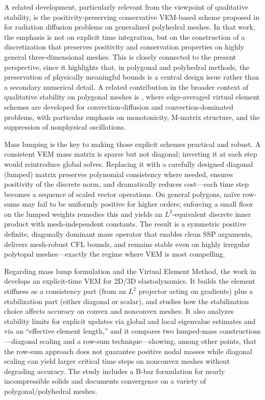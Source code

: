 \documentclass{article}
\begin{document}
A related development, particularly relevant from the viewpoint of qualitative stability, is the positivity-preserving conservative VEM-based scheme proposed in \cite{yang2022vem} for radiation diffusion problems on generalized polyhedral meshes. In that work, the emphasis is not on explicit time integration, but on the construction of a discretization that preserves positivity and conservation properties on highly general three-dimensional meshes. This is closely connected to the present perspective, since it highlights that, in polygonal and polyhedral methods, the preservation of physically meaningful bounds is a central design issue rather than a secondary numerical detail. A related contribution in the broader context of qualitative stability on polygonal meshes is \cite{cao2025edge}, where edge-averaged virtual element schemes are developed for convection-diffusion and convection-dominated problems, with particular emphasis on monotonicity, M-matrix structure, and the suppression of nonphysical oscillations.

Mass lumping is the key to making those explicit schemes practical and robust. A consistent VEM mass matrix is sparse but not diagonal; inverting it at each step would reintroduce global solves. Replacing it with a carefully designed diagonal (lumped) matrix preserves polynomial consistency where needed, ensures positivity of the discrete norm, and dramatically reduces cost—each time step becomes a sequence of scaled vector operations. On general polygons, naïve row-sums may fail to be uniformly positive for higher orders; enforcing a small floor on the lumped weights remedies this and yields an $L^2$-equivalent discrete inner product with mesh-independent constants. The result is a symmetric positive definite, diagonally dominant mass operator that enables clean SSP arguments, delivers mesh-robust CFL bounds, and remains stable even on highly irregular polytopal meshes—exactly the regime where VEM is most compelling.

Regarding mass lump formulation and the Virtual Element Method, the work in \cite{park2020elastodynamic} develops an explicit-time VEM for 2D/3D elastodynamics. It builds the element stiffness as a consistency part (from an $L^2$ projector acting on gradients) plus a stabilization part (either diagonal or scalar), and studies how the stabilization choice affects accuracy on convex and nonconvex meshes. It also analyzes stability limits for explicit updates via global and local eigenvalue estimates and via an “effective element length,” and it compares two lumped-mass constructions—diagonal scaling and a row-sum technique—showing, among other points, that the row-sum approach does not guarantee positive nodal masses while diagonal scaling can yield larger critical time steps on nonconvex meshes without degrading accuracy. The study includes a B-bar formulation for nearly incompressible solids and documents convergence on a variety of polygonal/polyhedral meshes. 
\end{document}
